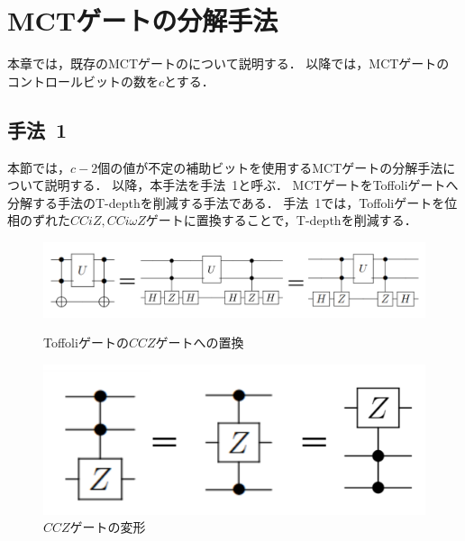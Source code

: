 \chapter{MCTゲートの分解手法}
本章では，既存のMCTゲートのについて説明する．
以降では，MCTゲートのコントロールビットの数を$c$とする．
\section{手法~1}
本節では，$c-2$個の値が不定の補助ビットを使用するMCTゲートの分解手法\cite{abdessaied2016technology}について説明する．
以降，本手法を手法~1と呼ぶ．
MCTゲートをToffoliゲートへ分解する手法\cite{barenco1995elementary}のT-depthを削減する手法である．
手法~1では，Toffoliゲートを位相のずれた$CCiZ, CCi\omega Z$ゲートに置換することで，T-depthを削減する．
\par
{}
\begin{figure}[tbp]
  \centering
  \begin{minipage}[b]{0.8\columnwidth}
    \centering
    \includegraphics[width=0.9\columnwidth]{img/toffoli_transform.pdf}
    \caption{Toffoliゲートの$CCZ$ゲートへの置換}
    \label{toffoli_transform}    
  \end{minipage}
  \begin{minipage}[b]{0.4\columnwidth}
    \centering
    \includegraphics[width=0.9\columnwidth]{img/zgate_transform.pdf}
    \caption{$CCZ$ゲートの変形}
    \label{zgate_transform}    
  \end{minipage}
\end{figure}
